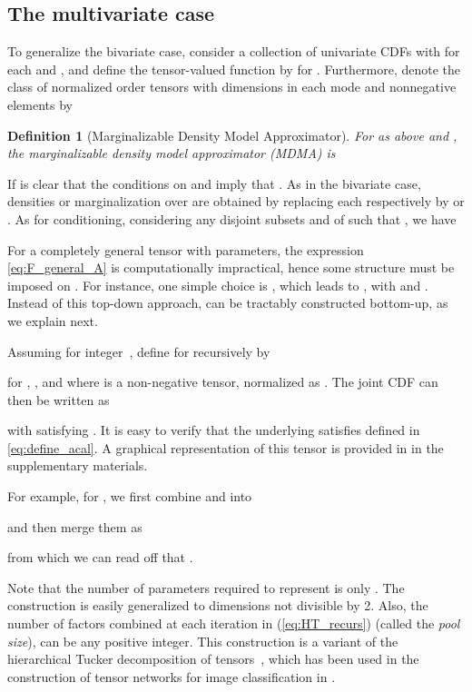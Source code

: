 \documentclass{article}
\newtheorem{definition}{Definition}
\begin{document}
\subsection{The multivariate case}\label{sec:multivariate}







To generalize the bivariate case, consider a collection of univariate CDFs  with  for each  and , and define the tensor-valued function  by  for .
Furthermore, denote the class of normalized order  tensors with  dimensions in each mode and nonnegative elements by

\begin{definition}[Marginalizable Density Model Approximator]
For  as above and ,
the marginalizable density model approximator (MDMA) is

\end{definition}
If is clear that the conditions on  and  imply that .  
As in the bivariate case, densities or marginalization over  are obtained by replacing each  respectively by  or . 
As for conditioning, considering any disjoint subsets  and  of  such that , we have  



For a completely general tensor 
with  parameters, the expression \eqref{eq:F_general_A} is computationally impractical, hence some structure must be imposed on .
For instance, one simple choice is , which leads to , with  and .
Instead of this top-down approach,  can be tractably constructed bottom-up, as we explain next. 


Assuming 
 for integer~, 
define 
for  recursively by
 
for , , and where  is a non-negative  tensor, normalized as . 
The joint CDF can then be written as

with  satisfying . 
It is easy to verify that the underlying  satisfies  defined in \eqref{eq:define_acal}. A graphical representation of this tensor is provided in  in the supplementary materials.  

For example, for , we first combine  and  into

and then merge them as 

from which we can read off that . 

Note that the number of parameters required to represent  is only . The construction is easily 
generalized to dimensions  not divisible by 2. 
Also, the number of  factors combined at 
each iteration in (\ref{eq:HT_recurs}) (called the \emph{pool size}),
 can be any positive integer.
 This construction is a variant of the hierarchical Tucker decomposition of tensors~\cite{Hackbusch2009-yr}, which has been used in the construction of tensor networks for image classification in \cite{cohen2016expressive}.  
\end{document}
